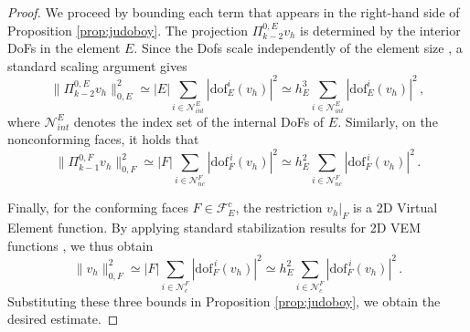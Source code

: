 \documentclass[a4paper,11pt]{article}
\theoremstyle{remark}
\theoremstyle{definition}
\begin{document}
\begin{proof}
We proceed by bounding each term that appears in the right-hand side of Proposition \ref{prop:judoboy}.
The projection $\Pi^{0,E}_{k-2} v_h$ is determined by the interior DoFs in the element $E$. Since the Dofs scale independently of the element size \cite{BeiradaVeiga-Brezzi-Marini-Russo:2014}, a standard scaling argument gives
$$\| \Pi^{0,E}_{k-2} v_h \|_{0,E}^2 \simeq |E| \sum_{i \in \mathcal{N}^{E}_{int}} |\text{dof}_E^i(v_h)|^2 \simeq h_E^3 \sum_{i \in \mathcal{N}^{E}_{int}} |\text{dof}_E^i(v_h)|^2 \, ,$$
where $\mathcal{N}^{E}_{int}$ denotes the index set of the internal DoFs of $E$.
Similarly, on the nonconforming faces, it holds that
$$\| \Pi^{0,F}_{k-1} v_h \|_{0,F}^2 \simeq |F| \sum_{i \in \mathcal{N}^{F}_{nc}} |\text{dof}_F^{\,i}(v_h)|^2 \simeq h_E^2 \sum_{i \in \mathcal{N}^{F}_{nc}} |\text{dof}_F^{\,i}(v_h)|^2 \, .$$

Finally, for the conforming faces $F \in \mathcal{F}^{c}_E$, the restriction $v_h|_F$ is a 2D Virtual Element function. By applying standard stabilization results for 2D VEM functions \cite{BeiraodaVeiga-Lovadina-Russo:2017,Chen-Huang:2018}, we thus obtain
$$
\| v_h \|_{0,F}^2 \simeq |F| \sum_{i \in \mathcal{N}^{F}_{c}} |\text{dof}_F^{\,i}(v_h)|^2 \simeq h_E^2 \sum_{i \in \mathcal{N}^{F}_{c}} |\text{dof}_F^{\,i}(v_h)|^2 \, .
$$
Substituting these three bounds in Proposition \ref{prop:judoboy}, we obtain the desired estimate.
\end{proof}
\end{document}
